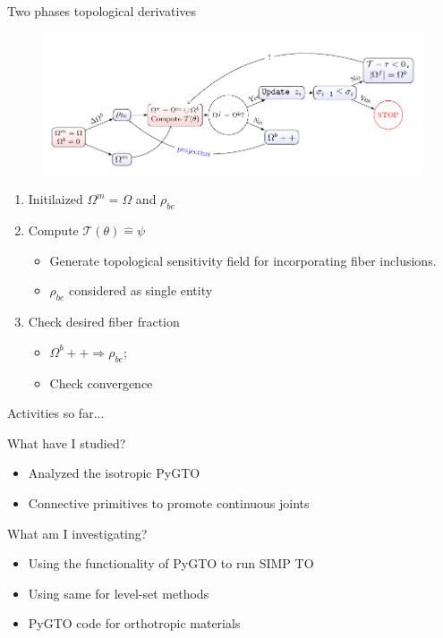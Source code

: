 \documentclass{beamer}
\newcommand{\circumeq}{\mathrel{\widehat{=}}}
\begin{document}
\begin{frame}{Two phases topological derivatives}
    \begin{figure}[!ht]
        \centering
        \includegraphics[width=1\textwidth]{./Schematics/treenodes.pdf}
        \label{fig:treenode}
    \end{figure}
    \begin{enumerate}
        \item Initilaized $\Omega^{m}=\Omega$ and $\rho_{be}$
        \item Compute $\mathcal{T}(\theta)\circumeq \psi$
              \begin{itemize}
                  \item Generate topological sensitivity field for incorporating fiber inclusions.
                  \item $\rho_{be}$ considered as single entity
              \end{itemize}
        \item Check desired fiber fraction
              \begin{itemize}
                  \item $\Omega^{b}++ \Rightarrow \rho_{be}$;
                  \item Check convergence
              \end{itemize}
    \end{enumerate}
\end{frame}

\begin{frame} {Activities so far...}
    \begin{block}{What have I studied?}
        \begin{itemize}
            \item Analyzed the isotropic PyGTO
            \item Connective primitives to promote continuous joints
        \end{itemize}
    \end{block}
    \begin{block}{What am I investigating?}
        \begin{itemize}
            \item Using the functionality of PyGTO to run SIMP TO
            \item Using same for level-set methods
            \item PyGTO code for orthotropic materials
        \end{itemize}
    \end{block}
\end{frame}
\end{document}
